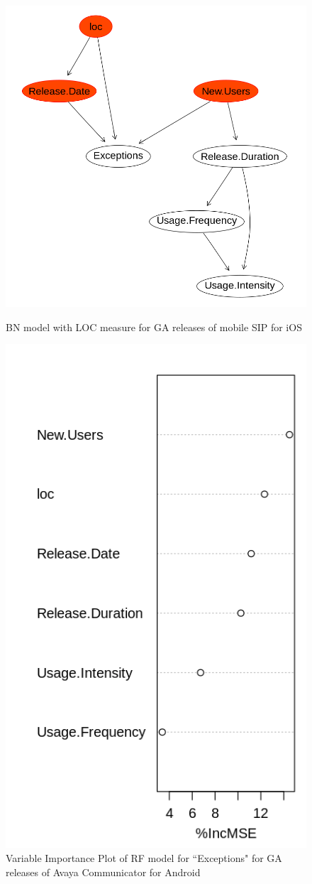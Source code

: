 \documentclass[smallcondensed]{svjour3}     %
\begin{document}
\begin{figure}[!t]
\centering
\begin{minipage}{.45\textwidth}
\includegraphics[width=\linewidth]{loc_i_bn}%
\caption{BN model with LOC measure for GA releases of mobile SIP for iOS}
\label{fig:lbni}
\end{minipage}
\hfill
\begin{minipage}{.45\textwidth}
\includegraphics[width=0.7\linewidth]{loc_ga_rf}%
\caption{Variable Importance Plot of RF model for ``Exceptions" for GA releases of Avaya Communicator for Android}
\label{fig:lrfg}
\end{minipage}
\end{figure}
\end{document}
